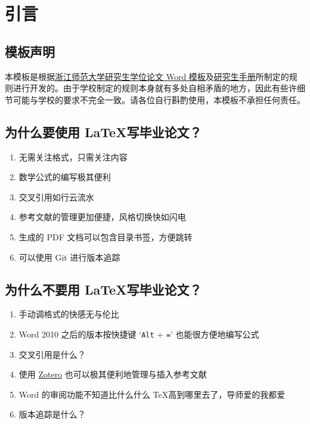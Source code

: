 
\chapter{引言}

\section{模板声明}

本模板是根据\href{http://sjxy.zjnu.edu.cn/2019/0312/c11807a283605/page.htm}{浙江师范大学研究生学位论文 Word 模板}及\href{http://yjsb.zjnu.edu.cn/2019/0919/c4723a299814/page.htm}{研究生手册}所制定的规则进行开发的。由于学校制定的规则本身就有多处自相矛盾的地方，因此有些许细节可能与学校的要求不完全一致。请各位自行斟酌使用，本模板不承担任何责任。

\section{为什么要使用 \LaTeX 写毕业论文？}

\begin{enumerate}
    \item 无需关注格式，只需关注内容
    \item 数学公式的编写极其便利
    \item 交叉引用如行云流水
    \item 参考文献的管理更加便捷，风格切换快如闪电
    \item 生成的 PDF 文档可以包含目录书签，方便跳转
    \item 可以使用 Git 进行版本追踪
\end{enumerate}

\section{为什么不要用 \LaTeX 写毕业论文？}

\begin{enumerate}
    \item 手动调格式的快感无与伦比
    \item Word 2010 之后的版本按快捷键 `\verb|Alt| + \verb|=|' 也能很方便地编写公式
    \item 交叉引用是什么？
    \item 使用 \href{https://www.zotero.org/}{Zotero} 也可以极其便利地管理与插入参考文献
    \item Word 的审阅功能不知道比什么什么 \TeX 高到哪里去了，导师爱的我都爱
    \item 版本追踪是什么？
\end{enumerate}

